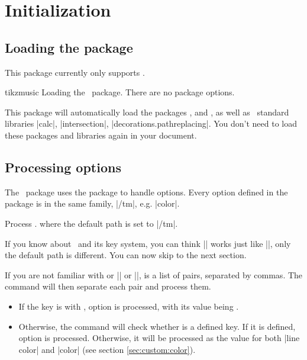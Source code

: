 \section{Initialization}\label{sec:init}
\subsection{Loading the package}\label{sec:init:load}
This package currently only supports \LaTeXe.

\begin{package}{tikzmusic}
  Loading the \tmname\ package. There are no package options.
\end{package}

This package will automatically load the packages ,  
and \tikzname, as well as \tikzname\ standard libraries |calc|, 
|intersection|, |decorations.pathreplacing|. You don't need to load these 
packages and libraries again in your document.
\subsection{Processing options}\label{sec:init:options}
The \tmname\ package uses the  package to handle options. Every 
option defined in the package is in the same family, |/tm|, e.g. 
|color|.

\begin{command}{\tmset{}}
  Process . where the default path is set to |/tm|.
\end{command}

If you know about \tikzname\ and its key system, you can think |\tmset| 
works just like |\tikzset|, only the default path is different. You can now skip 
to the next section.

If you are not familiar with  or |\pgfkeys| or 
|\tikzset|,  is a list of  
pairs, separated by commas. The command will then separate each pair and process 
them.

\begin{itemize}
  \item If the key is with , option 
  is processed, with its value being .
  \item Otherwise, the command will check whether  is a defined key. 
  If it is defined, option  is processed. 
  Otherwise, it will be processed as the value for both |line color| and |color| 
  (see section \ref{sec:custom:color}).
\end{itemize}

